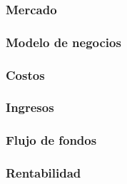 \documentclass[../../../main.tex]{subfiles}
\begin{document}
\subsubsection{Mercado}\label{subsubsec:mercado}


\subsubsection{Modelo de negocios}\label{subsubsec:modelo}


\subsubsection{Costos}\label{subsubsec:costos}


\subsubsection{Ingresos}\label{subsubsec:ingresos}


\subsubsection{Flujo de fondos}\label{subsubsec:flujo}


\subsubsection{Rentabilidad}\label{subsubsec:rentabilidad}

\end{document}
